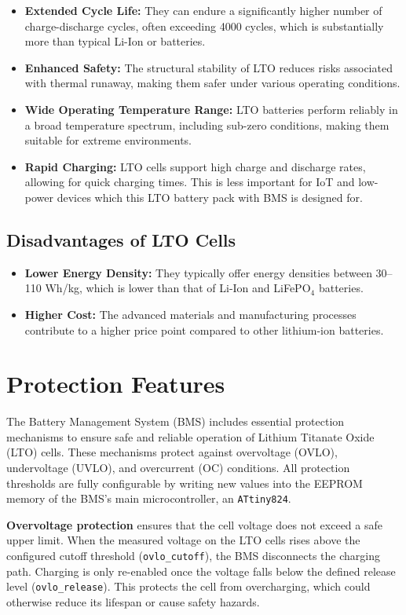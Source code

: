 \documentclass[11pt]{datasheet}
\begin{document}
\begin{itemize}
\item \textbf{Extended Cycle Life:} They can endure a significantly higher number of charge-discharge cycles, often exceeding 4000 cycles, which is substantially more than typical Li-Ion or  batteries.
\item \textbf{Enhanced Safety:} The structural stability of LTO reduces risks associated with thermal runaway, making them safer under various operating conditions.
\item \textbf{Wide Operating Temperature Range:} LTO batteries perform reliably in a broad temperature spectrum, including sub-zero conditions, making them suitable for extreme environments.
\item \textbf{Rapid Charging:} LTO cells support high charge and discharge rates, allowing for quick charging times. This is less important for IoT and low-power devices which this LTO battery pack with BMS is designed for.
\end{itemize}

\subsection{Disadvantages of LTO Cells}

\begin{itemize}
\item \textbf{Lower Energy Density:} They typically offer energy densities between 30–110 Wh/kg, which is lower than that of Li-Ion and LiFePO$_4$ batteries.
\item \textbf{Higher Cost:} The advanced materials and manufacturing processes contribute to a higher price point compared to other lithium-ion batteries.
\end{itemize}

\section{Protection Features}

The Battery Management System (BMS) includes essential protection mechanisms to ensure safe and reliable operation of Lithium Titanate Oxide (LTO) cells. These mechanisms protect against overvoltage (OVLO), undervoltage (UVLO), and overcurrent (OC) conditions. All protection thresholds are fully configurable by writing new values into the EEPROM memory of the BMS's main microcontroller, an \texttt{ATtiny824}.

\textbf{Overvoltage protection} ensures that the cell voltage does not exceed a safe upper limit. When the measured voltage on the LTO cells rises above the configured cutoff threshold (\texttt{ovlo\_cutoff}), the BMS disconnects the charging path. Charging is only re-enabled once the voltage falls below the defined release level (\texttt{ovlo\_release}). This protects the cell from overcharging, which could otherwise reduce its lifespan or cause safety hazards.
\end{document}
